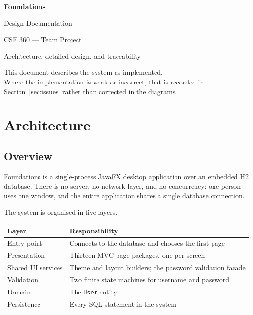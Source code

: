\documentclass[11pt,a4paper]{article}
\newcommand{\cls}[1]{\texttt{#1}}
\begin{document}

\begin{titlepage}
\centering
\vspace*{4cm}
{\Huge\bfseries Foundations\par}
\vspace{0.6cm}
{\Large Design Documentation\par}
\vspace{1.2cm}
{\large CSE 360 --- Team Project\par}
\vspace{0.4cm}
{\color{muted}\large Architecture, detailed design, and traceability\par}
\vfill
{\color{muted}\small
This document describes the system as implemented.\\
Where the implementation is weak or incorrect, that is recorded in
Section~\ref{sec:issues} rather than corrected in the diagrams.\par}
\vspace{1cm}
\end{titlepage}

\tableofcontents
\newpage

\section{Architecture}
\label{sec:arch}

\subsection{Overview}

Foundations is a single-process JavaFX desktop application over an embedded H2 database.
There is no server, no network layer, and no concurrency: one person uses one window, and
the entire application shares a single database connection.

The system is organised in five layers.

\begin{center}
\begin{tabularx}{\linewidth}{@{}lX@{}}
\toprule
\textbf{Layer} & \textbf{Responsibility} \\
\midrule
Entry point & Connects to the database and chooses the first page \\
Presentation & Thirteen MVC page packages, one per screen \\
Shared UI services & Theme and layout builders; the password validation facade \\
Validation & Two finite state machines for username and password \\
Domain & The \cls{User} entity \\
Persistence & Every SQL statement in the system \\
\bottomrule
\end{tabularx}
\end{center}
\end{document}
